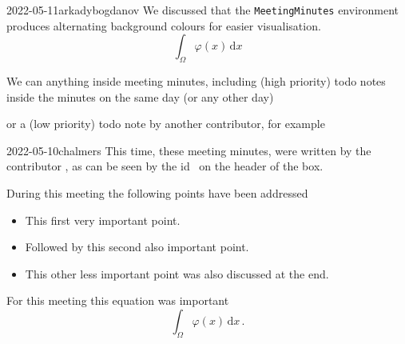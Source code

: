 \documentclass{project-logbook}
\begin{document}
{	\begin{MeetingMinutes}{2022-05-11}{arkadybogdanov}
		We discussed that the \texttt{MeetingMinutes} environment produces alternating background colours for easier visualisation.
		\begin{equation}
			\int_{\Omega}{\varphi(x)}\,\mathrm{d}x
		\end{equation}
		
		\lipsum[3]
		
		We can anything inside meeting minutes, including (high priority) todo notes inside the minutes on the same day (or any other day)
		
		
		or a (low priority) todo note by another contributor, for example
		
	\end{MeetingMinutes}
	
	\begin{MeetingMinutes}{2022-05-10}{chalmers}
		This time, these meeting minutes, were written by the contributor , as can be seen by the id \emph{}~on the header of the box.
		
		During this meeting the following points have been addressed
		\begin{itemize}
			\item This first very important point.
			\item Followed by this second also important point.
			\item This other less important point was also discussed at the end.
		\end{itemize}
		
		For this meeting this equation was important
		\begin{equation}
			\int_{\Omega}{\varphi(x)}\,\mathrm{d}x\,.
		\end{equation}
		\lipsum[2]
		

\end{MeetingMinutes}}
\end{document}
